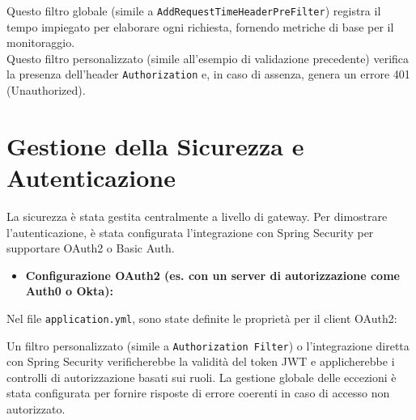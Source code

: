 
Questo filtro globale (simile a \texttt{AddRequestTimeHeaderPreFilter}) registra il tempo impiegato per elaborare ogni richiesta, fornendo metriche di base per il monitoraggio. \\


Questo filtro personalizzato (simile all'esempio di validazione precedente) verifica la presenza dell'header \texttt{Authorization} e, in caso di assenza, genera un errore 401 (Unauthorized).

\section{Gestione della Sicurezza e Autenticazione}
La sicurezza è stata gestita centralmente a livello di gateway. Per dimostrare l'autenticazione, è stata configurata l'integrazione con Spring Security per supportare OAuth2 o Basic Auth.
\begin{itemize}
    \item \textbf{Configurazione OAuth2 (es. con un server di autorizzazione come Auth0 o Okta):}
\end{itemize}
Nel file \texttt{application.yml}, sono state definite le proprietà per il client OAuth2:


Un filtro personalizzato (simile a \texttt{Authorization Filter}) o l'integrazione diretta con Spring Security verificherebbe la validità del token JWT e applicherebbe i controlli di autorizzazione basati sui ruoli. La gestione globale delle eccezioni è stata configurata per fornire risposte di errore coerenti in caso di accesso non autorizzato.

